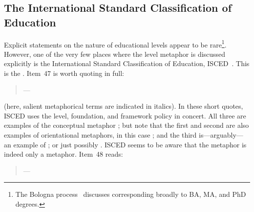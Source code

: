\subsection{The International Standard Classification of Education}

Explicit statements on the nature of educational levels appear to be
rare\footnote{The Bologna process~\parencite{keeling2006} discusses
   corresponding broadly to BA, MA, and PhD degrees.}.
However, one of the very few places where the level metaphor is
discussed explicitly is the International Standard Classification of
Education,
ISCED~\parencite{unesco_institute_for_statistics_international_2012}.
This is the .  Item~47 is worth
quoting in full:

\begin{singlespace}
\begin{quote}
---\parencite[item
  47]{unesco_institute_for_statistics_international_2012}
\end{quote}
\end{singlespace}

\noindent
(here, salient metaphorical terms are indicated in italics).  In these
short quotes, ISCED uses the level, foundation, and framework policy
in concert.  All three are examples of the conceptual metaphor
; but note that the first and second are
also examples of orientational metaphors, in this case ; and the third is---arguably---an example of ; or just possibly .
ISCED seems to be aware that the  metaphor is indeed
only a metaphor.  Item~48 reads:

\begin{singlespace}
\begin{quote}
  ---\parencite[item
    47]{unesco_institute_for_statistics_international_2012}
\end{quote}
\end{singlespace}

